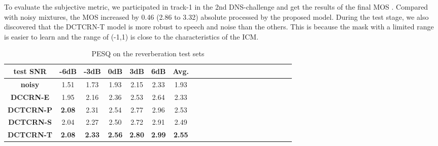 \documentclass[journal,10pt]{IEEEtran}
\begin{document}
To evaluate the subjective metric, we participated in track-1 in the 2nd DNS-challenge and get the results of the final MOS \cite{reddy2020icassp}. Compared with noisy mixtures, the MOS increased by 0.46 (2.86 to 3.32) absolute processed by the proposed model. During the test stage, we also discovered that the DCTCRN-T model is more robust to speech and noise than the others. This is because the mask with a limited range is easier to learn and the range of (-1,1) is close to the characteristics of the ICM.


\begin{table}[t]  \centering
\small
\caption{PESQ on the reverberation test sets}
\label{tab:pesqr}
\setlength{\tabcolsep}{1.7mm}
\begin{tabular}{c<{\centering}|c<{\centering}c<{\centering}c<{\centering}c<{\centering}c<{\centering}c<{\centering}c<{\centering}c<{\centering}c<{\centering}c<{\centering}|c<{\centering}c<{\centering}c<{\centering}c<{\centering}c<{\centering}c<{\centering}c<{\centering}c<{\centering}c<{\centering}c<{\centering}}
\hline
\hline
\textbf{test SNR} & \textbf{-6dB }& \textbf{-3dB} & \textbf{0dB} & \textbf{3dB} & \textbf{6dB} & \textbf{Avg.} \\
\hline
\hline
\textbf{noisy}     & 1.51 & 1.73 & 1.93 & 2.15 & 2.33 & 1.93 \\
\textbf{DCCRN-E}   & 1.95 & 2.16 & 2.36 & 2.53 & 2.64 & 2.33 \\
\textbf{DCTCRN-P}  & \textbf{2.08} & 2.31 & 2.54 & 2.77 & 2.96 & 2.53 \\
\textbf{DCTCRN-S}  & 2.04 & 2.27 & 2.50 & 2.72 & 2.91 & 2.49 \\
\textbf{DCTCRN-T}  & \textbf{2.08} & \textbf{2.33} & \textbf{2.56} & \textbf{2.80} & \textbf{2.99} & \textbf{2.55} \\
\hline
\hline
\end{tabular}
\end{table}
\end{document}
